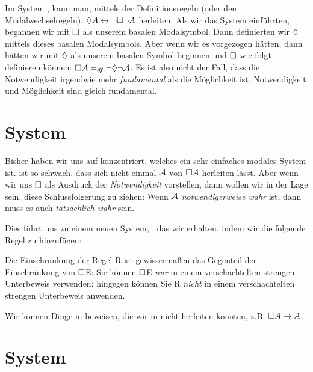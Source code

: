 Im System \mlK, kann man, mittels der Definitionsregeln (oder den Modalwechselregeln), $\Diamond A \leftrightarrow \neg\Box\neg A$ herleiten. Als wir das System \mlK einführten, begannen wir mit $\Box$ als unserem basalen Modalsymbol. Dann definierten wir $\Diamond$ mittels dieses basalen Modalsymbols. Aber wenn wir es vorgezogen hätten, dann hätten wir mit $\Diamond$ als unserem basalen Symbol beginnen und $\Box$ wie folgt definieren können: $\Box\mathcal{A} =_{df} \neg \Diamond \neg \mathcal{A}$. Es ist also nicht der Fall, dass die Notwendigkeit irgendwie mehr \emph{fundamental} als die Möglichkeit ist. Notwendigkeit und Möglichkeit sind gleich fundamental.

\section{System \mlT}
\label{T}

Bisher haben wir uns auf \mlK konzentriert, welches ein sehr einfaches modales System ist. \mlK{} ist so schwach, dass sich nicht einmal $\mathcal{A}$ von $\Box\mathcal{A}$ herleiten lässt. Aber wenn wir uns $\Box$ als Ausdruck der \emph{Notwendigkeit} vorstellen, dann wollen wir in der Lage sein, diese Schlussfolgerung zu ziehen: Wenn $\mathcal{A}$ \emph{notwendigerweise wahr} ist, dann muss es auch \emph{tatsächlich wahr} sein.

Dies führt uns zu einem neuen System, \mlT, das wir erhalten, indem wir die folgende Regel zu \mlK hinzufügen:

Die Einschränkung der Regel R\mlT{} ist gewissermaßen das Gegenteil der Einschränkung von $\Box$E: Sie können $\Box$E \emph{nur} in einem verschachtelten strengen Unterbeweis verwenden; hingegen können Sie R\mlT{} \emph{nicht} in einem verschachtelten strengen Unterbeweis anwenden.

Wir können Dinge in \mlT{} beweisen, die wir in \mlK nicht herleiten konnten, z.B. $\Box A \rightarrow A$.

\section{System \mlSfour}
\label{S4}

